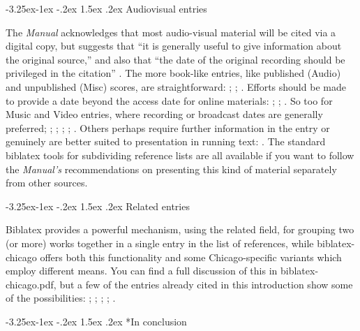 \documentclass[a4paper,12pt]{article}
\makeatletter
\renewcommand{\section}{\@startsection{section}{1}{\z@}%
                                     {-3.25ex\@plus -1ex \@minus -.2ex}%
                                     {1.5ex \@plus .2ex}%
                                     {\normalfont\large\bfseries}}
\renewcommand{\subsection}{\@startsection{subsection}{2}{\z@}%
                                     {-3.25ex\@plus -1ex \@minus -.2ex}%
                                     {1.5ex \@plus .2ex}%
                                     {\normalfont\normalsize\bfseries}}
\makeatother
\begin{document}
\subsection{Audiovisual entries}
\label{sec:audiovisual}

The \emph{Manual}  acknowledges that most
audio-visual material will be cited via a digital copy, but suggests
that \enquote{it is generally useful to give information about the
  original source,} and also that \enquote{the date of the original
  recording should be privileged in the citation}
\autocite[15.57]{chicago:manual}.  The more book-like entries, like
published (\textsf{Audio}) and unpublished (\textsf{Misc}) scores, are
straightforward: \autocite{schubert:muellerin};
\autocite{verdi:corsaro}; \autocite{shapey:partita}.  Efforts should
be made to provide a date beyond the access date for online materials:
\autocite{coolidge:speech}; \autocite{horowitz:youtube};
\autocite{pollan:plant}.  So too for \textsf{Music} and \textsf{Video}
entries, where recording or broadcast dates are generally preferred;
\autocite{auden:reading}; \autocite{friends:leia};
\autocite{handel:messiah}; \autocite{holiday:fool};
\autocite{nytrumpet:art}.  Others perhaps require further information
in the entry or genuinely are better suited to presentation in running
text: \autocite{beethoven:sonata29}.  The standard \textsf{biblatex}
tools for subdividing reference lists are all available if you want to
follow the \emph{Manual's} recommendations on presenting this kind of
material separately from other sources.

\subsection{Related entries}
\label{sec:related}

\textsf{Biblatex} provides  a powerful
mechanism, using the \textsf{related} field, for grouping two (or
more) works together in a single entry in the list of references,
while \textsf{biblatex-chicago} offers both this functionality and
some Chicago-specific variants which employ different means.  You can
find a full discussion of this in \textsf{biblatex-chicago.pdf}, but a
few of the entries already cited in this introduction show some of the
possibilities: \autocites{ac:comment}{ellis:blog-customc};
\autocite{aristotle:metaphy:trans}; \autocite{coolidge:speech};
\autocite{emerson:nature}; \autocite{schweitzer:bach}.

\section*{In conclusion}
\label{sec:conclude}
\end{document}
